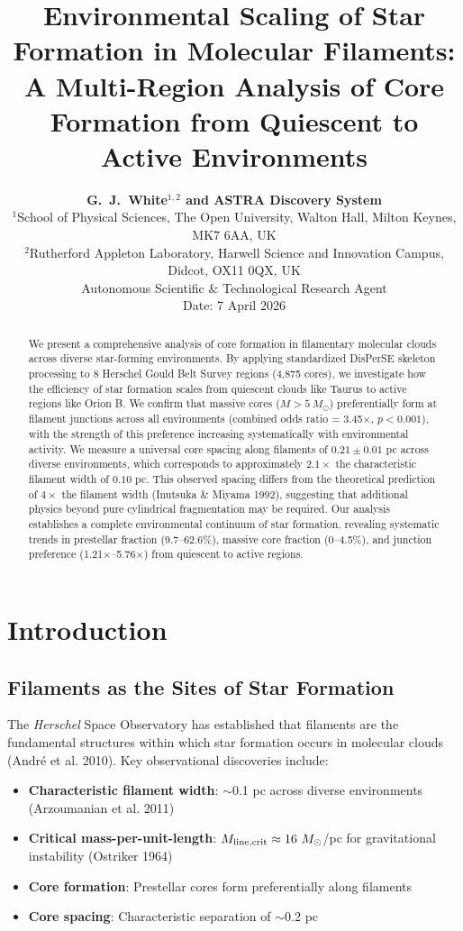 \documentclass[11pt,a4paper]{article}
\title{\textbf{\Large Environmental Scaling of Star Formation in Molecular Filaments:\\
\large{A Multi-Region Analysis of Core Formation from Quiescent to Active Environments}}}
\author{\textbf{G.~J.~White$^{1,2}$ and ASTRA Discovery System}\\
\small{$^{1}$School of Physical Sciences, The Open University, Walton Hall, Milton Keynes, MK7 6AA, UK}\\
\small{$^{2}$Rutherford Appleton Laboratory, Harwell Science and Innovation Campus, Didcot, OX11 0QX, UK}\\
\small{Autonomous Scientific \& Technological Research Agent}\\
\small{Date: 7 April 2026}}
\begin{document}
\maketitle

\begin{abstract}
We present a comprehensive analysis of core formation in filamentary molecular clouds across diverse star-forming environments. By applying standardized DisPerSE skeleton processing to 8 Herschel Gould Belt Survey regions (4,875 cores), we investigate how the efficiency of star formation scales from quiescent clouds like Taurus to active regions like Orion B. We confirm that massive cores ($M > 5~M_\odot$) preferentially form at filament junctions across all environments (combined odds ratio = 3.45$\times$, $p < 0.001$), with the strength of this preference increasing systematically with environmental activity. We measure a universal core spacing along filaments of $0.21 \pm 0.01$ pc across diverse environments, which corresponds to approximately $2.1\times$ the characteristic filament width of $0.10$ pc. This observed spacing differs from the theoretical prediction of $4\times$ the filament width (Inutsuka \& Miyama 1992), suggesting that additional physics beyond pure cylindrical fragmentation may be required. Our analysis establishes a complete environmental continuum of star formation, revealing systematic trends in prestellar fraction (9.7--62.6\%), massive core fraction (0--4.5\%), and junction preference (1.21$\times$--5.76$\times$) from quiescent to active regions.
\end{abstract}

\tableofcontents

\section{Introduction}

\subsection{Filaments as the Sites of Star Formation}

The \textit{Herschel} Space Observatory has established that filaments are the fundamental structures within which star formation occurs in molecular clouds (Andr\'e et al. 2010). Key observational discoveries include:

\begin{itemize}
    \item \textbf{Characteristic filament width}: $\sim$0.1 pc across diverse environments (Arzoumanian et al. 2011)
    \item \textbf{Critical mass-per-unit-length}: $M_{\rm line,crit} \approx 16~M_\odot$/pc for gravitational instability (Ostriker 1964)
    \item \textbf{Core formation}: Prestellar cores form preferentially along filaments
    \item \textbf{Core spacing}: Characteristic separation of $\sim$0.2 pc
\end{itemize}
\end{document}
